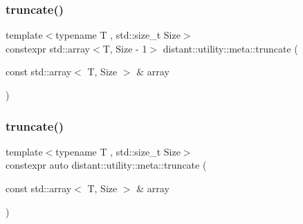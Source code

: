 \mbox{\label{namespacedistant_1_1utility_1_1meta_ab001afce8c8e9e18d68a47eab7b95768}} 
\subsubsection{\texorpdfstring{truncate()}{truncate()}\hspace{0.1cm}{\footnotesize\ttfamily [1/2]}}
{\footnotesize\ttfamily template$<$typename T , std\+::size\+\_\+t Size$>$ \\
constexpr std\+::array$<$T, Size -\/ 1$>$ distant\+::utility\+::meta\+::truncate (\begin{DoxyParamCaption}\item[{const std\+::array$<$ T, Size $>$ \&}]{array }\end{DoxyParamCaption})\hspace{0.3cm}{\ttfamily [noexcept]}}

\mbox{\label{namespacedistant_1_1utility_1_1meta_a3fd8f830012e6174a5098a2fbb22d0b3}} 
\subsubsection{\texorpdfstring{truncate()}{truncate()}\hspace{0.1cm}{\footnotesize\ttfamily [2/2]}}
{\footnotesize\ttfamily template$<$typename T , std\+::size\+\_\+t Size$>$ \\
constexpr auto distant\+::utility\+::meta\+::truncate (\begin{DoxyParamCaption}\item[{const std\+::array$<$ T, Size $>$ \&}]{array }\end{DoxyParamCaption})\hspace{0.3cm}{\ttfamily [noexcept]}}

